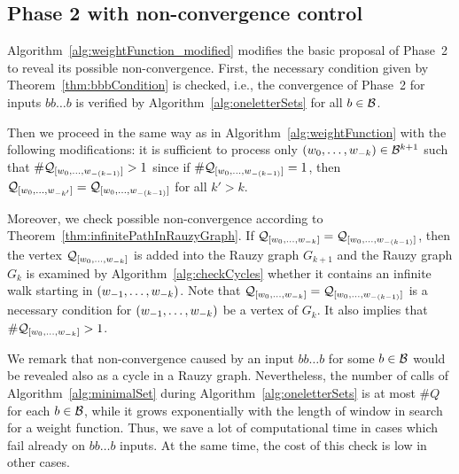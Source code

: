 \subsection*{Phase 2 with non-convergence control}
Algorithm~\ref{alg:weightFunction_modified} modifies the basic proposal of Phase~2 to reveal its possible non-convergence. First, the necessary condition given by Theorem~\ref{thm:bbbCondition} is checked, i.e., the convergence of Phase~2 for inputs $bb\dots b$ is verified by Algorithm~\ref{alg:oneletterSets} for all $b\in\mathcal{B}$. 

Then we proceed in the same way as in Algorithm~\ref{alg:weightFunction} with the following modifications: it is sufficient to process only $(w_{0}, \dots, w_{-k}) \in \mathcal{B}^{k+1}$ such that $\#\mathcal{Q}_{[w_{0}, \dots, w_{-(k-1)}]}>1$ since if $\#\mathcal{Q}_{[w_{0}, \dots, w_{-(k-1)}]}=1$, then $\mathcal{Q}_{[w_{0}, \dots, w_{-k'}]}=\mathcal{Q}_{[w_{0}, \dots, w_{-(k-1)}]}$ for all $k'>k$. 

Moreover, we check possible non-convergence according to Theorem~\ref{thm:infinitePathInRauzyGraph}. If $\mathcal{Q}_{[w_{0}, \dots, w_{-k}]} = \mathcal{Q}_{[w_{0}, \dots, w_{-(k-1)}]}$, then the vertex $\mathcal{Q}_{[w_{0}, \dots, w_{-k}]}$ is added into the Rauzy graph $G_{k+1}$ and the Rauzy graph $G_k$ is examined by Algorithm~\ref{alg:checkCycles} whether it contains an infinite walk starting in $(w_{-1}, \dots, w_{-k})$. Note that $\mathcal{Q}_{[w_{0}, \dots, w_{-k}]} = \mathcal{Q}_{[w_{0}, \dots, w_{-(k-1)}]}$ is a necessary condition for $(w_{-1}, \dots, w_{-k})$ be a vertex of $G_k$. It also implies that $\#\mathcal{Q}_{[w_{0}, \dots, w_{-k}]}>1$.

We remark that  non-convergence caused by an input $bb\dots b$ for some $b\in\mathcal{B}$ would be revealed also as a cycle in a Rauzy graph. Nevertheless, the number of calls of Algorithm~\ref{alg:minimalSet} during Algorithm~\ref{alg:oneletterSets} is at most $\#Q$ for each $b\in\mathcal{B}$, while it grows exponentially with the length of window in search for a weight function. Thus, we save a lot of computational time in cases which fail already on $bb\dots b$ inputs. At the same time, the cost of this check is low in other cases.

